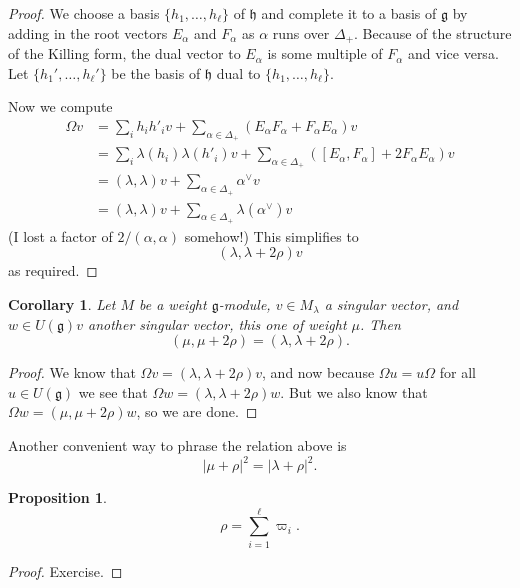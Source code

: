 \documentclass[12pt]{article}
\theoremstyle{plain}
\newtheorem{prop}[thm]{Proposition}
\newtheorem{cor}[thm]{Corollary}
\theoremstyle{definition}
\numberwithin{equation}{section}
\newcommand{\al}{\alpha}
\newcommand{\la}{\lambda}
\newcommand{\Om}{\Omega}
\newcommand{\D}{\Delta}
\newcommand{\g}{\mathfrak{g}}
\newcommand{\h}{\mathfrak{h}}
\begin{document}
\begin{proof}
We choose a basis $\{h_1, \ldots, h_\ell\}$ of $\h$ and complete it to a basis of $\g$ by adding in the root vectors $E_{\al}$ and $F_\al$ as $\al$ runs over $\D_+$. Because of the structure of the Killing form, the dual vector to $E_\al$ is some multiple of $F_\al$ and vice versa. Let $\{h_1', \ldots, h_\ell'\}$ be the basis of $\h$ dual to $\{h_1, \ldots, h_\ell\}$.

Now we compute
\begin{align*}
\Omega v &= \sum_i h_i h'_i v + \sum_{\al \in \D_+} ( E_\al F_\al + F_\al E_\al ) v \\
%
&= \sum_i \la(h_i) \la(h'_i) v + \sum_{\al \in \D_+} ( [E_\al, F_\al] + 2 F_\al E_\al ) v \\
%
&= (\la, \la) v + \sum_{\al \in \D_+} \al^\vee v \\
%
&= (\la, \la) v + \sum_{\al \in \D_+} \la(\al^\vee) v
\end{align*}
{\color{red}(I lost a factor of $2/(\al, \al)$ somehow!)} This simplifies to
\[
(\la, \la+2\rho) v
\]
as required.
\end{proof}

\begin{cor}
Let $M$ be a weight $\g$-module, $v \in M_\la$ a singular vector, and $w \in U(\g) v$ another singular vector, this one of weight $\mu$. Then
\[
(\mu, \mu+2\rho) = (\la, \la+2\rho).
\]
\end{cor}

\begin{proof}
We know that $\Om v = (\la, \la+2\rho) v$, and now because $\Om u = u \Om$ for all $u \in U(\g)$ we see that $\Om w = (\la, \la+2\rho) w$. But we also know that $\Om w = (\mu, \mu+2\rho) w$, so we are done.
\end{proof}
Another convenient way to phrase the relation above is
\[
|\mu+\rho|^2 = |\la+\rho|^2.
\]


\begin{prop}
\[
\rho = \sum_{i=1}^\ell \varpi_i.
\]
\end{prop}

\begin{proof}
Exercise.
\end{proof}
\end{document}
